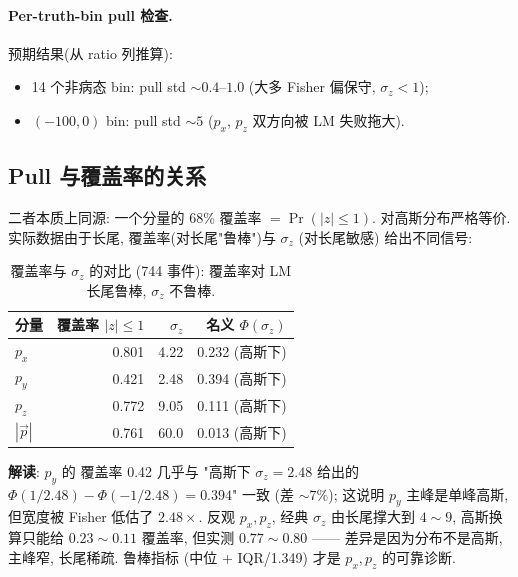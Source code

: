 \paragraph{Per-truth-bin pull 检查.}

预期结果(从  ratio 列推算):
\begin{itemize}[nosep]
  \item 14 个非病态 bin: pull std $\sim 0.4$--$1.0$ (大多 Fisher 偏保守, $\sigma_z < 1$);
  \item $(-100, 0)$ bin: pull std $\sim 5$ ($p_x$, $p_z$ 双方向被 LM 失败拖大).
\end{itemize}

\subsection{Pull 与覆盖率的关系}
\label{sec:partIII:pulls:vs_coverage}

二者本质上同源: 一个分量的 68\% 覆盖率 $= \Pr(|z| \le 1)$. 对高斯分布严格等价. 实际数据由于长尾, 覆盖率(对长尾"鲁棒")与 $\sigma_z$ (对长尾敏感) 给出不同信号:

\begin{table}[H]
\centering\small
\caption{覆盖率与 $\sigma_z$ 的对比 (744 事件): 覆盖率对 LM 长尾鲁棒, $\sigma_z$ 不鲁棒.}
\label{tab:partIII:pull_vs_coverage}
\begin{tabular}{lrrr}
\toprule
分量 & 覆盖率 $|z|\le 1$ & $\sigma_z$ & 名义 $\Phi(\sigma_z)$ \\
\midrule
$p_x$ & 0.801 & 4.22 & 0.232 (高斯下) \\
$p_y$ & 0.421 & 2.48 & 0.394 (高斯下) \\
$p_z$ & 0.772 & 9.05 & 0.111 (高斯下) \\
$|\vec p|$ & 0.761 & 60.0 & 0.013 (高斯下) \\
\bottomrule
\end{tabular}
\end{table}

\textbf{解读}: $p_y$ 的 覆盖率 0.42 几乎与 "高斯下 $\sigma_z = 2.48$ 给出的 $\Phi(1/2.48) - \Phi(-1/2.48) = 0.394$" 一致 (差 $\sim 7\%$); 这说明 $p_y$ 主峰是单峰高斯, 但宽度被 Fisher 低估了 $2.48\times$. 反观 $p_x, p_z$, 经典 $\sigma_z$ 由长尾撑大到 $4 \sim 9$, 高斯换算只能给 $0.23 \sim 0.11$ 覆盖率, 但实测 $0.77 \sim 0.80$ —— 差异是因为分布不是高斯, 主峰窄, 长尾稀疏. 鲁棒指标 (中位 + IQR/1.349) 才是 $p_x, p_z$ 的可靠诊断.

